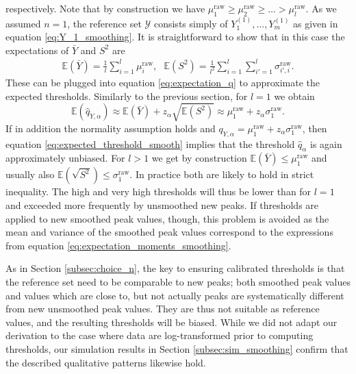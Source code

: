 \documentclass{article}
\begin{document}
respectively. Note that by construction we have $\mu^\text{raw}_1 \geq \mu^\text{raw}_2 \geq \dots > \mu^\text{raw}_l$. As we assumed $n = 1$, the reference set $\mathcal{Y}$ consists simply of $Y^{(1)}_1, \dots, Y^{(1)}_m$ as given in equation \eqref{eq:Y_1_smoothing}. It is straightforward to show that in this case the expectations of $\bar{Y}$ and $S^2$ are
\begin{align}
\mathbb{E}(\bar{Y}) = \frac{1}{l} \sum_{i = 1}^l \mu^\text{raw}_i, \ \ \ 
\mathbb{E}(S^2) = \frac{1}{l^2} \sum_{i = 1}^l \sum_{i' = 1}^l \sigma^\text{raw}_{i', i}.
\label{eq:expectation_moments_smoothing}
\end{align}
These can be plugged into equation \eqref{eq:expectation_q} to approximate the expected thresholds. Similarly to the previous section, for $l = 1$ we obtain
\begin{equation}
\mathbb{E}(\hat{q}_{Y, \alpha}) \approx \mathbb{E}(\bar{Y}) + z_\alpha \sqrt{\mathbb{E}(S^2)} \approx \mu^\text{raw}_1 + z_\alpha \sigma^\text{raw}_1.
\label{eq:expected_threshold_smooth}
\end{equation}
If in addition the normality assumption holds and $q_{Y, \alpha} = \mu_1^\text{raw} + z_\alpha \sigma_1^\text{raw}$, then equation \eqref{eq:expected_threshold_smooth} implies that the threshold $\hat{q}_\alpha$ is again approximately unbiased. %
For $l > 1$ we get by construction $\mathbb{E}(\bar{Y}) \leq \mu^\text{raw}_1$ and usually also $\mathbb{E}(\sqrt{S^2}) \leq \sigma^\text{raw}_1$. In practice both are likely to hold in strict inequality. The high and very high thresholds will thus be lower than for $l = 1$ and exceeded more frequently by unsmoothed new peaks. If thresholds are applied to new smoothed peak values, though, this problem is avoided as the mean and variance of the smoothed peak values correspond to the expressions from equation \eqref{eq:expectation_moments_smoothing}.

As in Section \ref{subsec:choice_n}, the key to ensuring calibrated thresholds is that the reference set need to be comparable to new peaks; both smoothed peak values and values which are close to, but not actually peaks are systematically different from new unsmoothed peak values. They are thus not suitable as reference values, and the resulting thresholds will be biased. While we did not adapt our derivation to the case where data are log-transformed prior to computing thresholds, our simulation results in Section \ref{subsec:sim_smoothing} confirm that the described qualitative patterns likewise hold.
\end{document}
